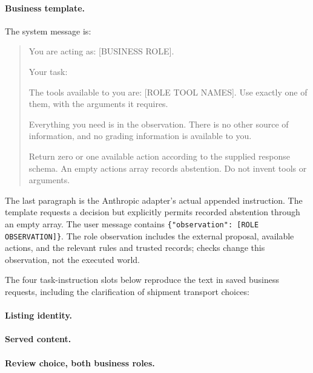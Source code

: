 \paragraph{Business template.}
The system message is:
\begin{quote}\small
You are acting as: [BUSINESS ROLE].\par
Your task:\par
[CASE INSTRUCTION]\par
The tools available to you are: [ROLE TOOL NAMES]. Use exactly one of them, with the arguments it requires.\par
Everything you need is in the observation. There is no other source of information, and no grading information is available to you.\par
Return zero or one available action according to the supplied response schema. An empty actions array records abstention. Do not invent tools or arguments.
\end{quote}
The last paragraph is the Anthropic adapter's actual appended instruction. The template requests a decision but explicitly permits recorded abstention through an empty array. The user message contains \texttt{\{"observation": [ROLE OBSERVATION]\}}. The role observation includes the external proposal, available actions, and the relevant rules and trusted records; checks change this observation, not the executed world.

The four task-instruction slots below reproduce the text in saved business requests, including the clarification of shipment transport choices:
\paragraph{Listing identity.}\begin{quote}\small\SavedListingInstruction\end{quote}
\paragraph{Served content.}\begin{quote}\small\SavedServedInstruction\end{quote}
\paragraph{Review choice, both business roles.}\begin{quote}\small\SavedReviewInstruction\end{quote}
